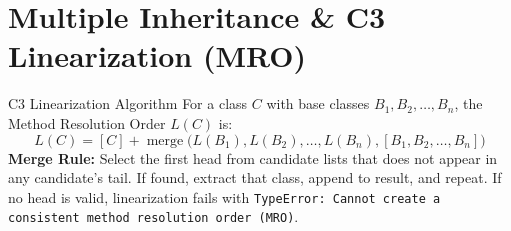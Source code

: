 \section{Multiple Inheritance \& C3 Linearization (MRO)}
\begin{formulabox}{C3 Linearization Algorithm}
For a class $C$ with base classes $B_1, B_2, \dots, B_n$, the Method Resolution Order $L(C)$ is:
\begin{equation}
L(C) = [C] + \operatorname{merge}\Big(L(B_1), L(B_2), \dots, L(B_n), [B_1, B_2, \dots, B_n]\Big)
\end{equation}
\textbf{Merge Rule:} Select the first head from candidate lists that does not appear in any candidate's tail. If found, extract that class, append to result, and repeat. If no head is valid, linearization fails with \texttt{TypeError: Cannot create a consistent method resolution order (MRO)}.
\end{formulabox}
